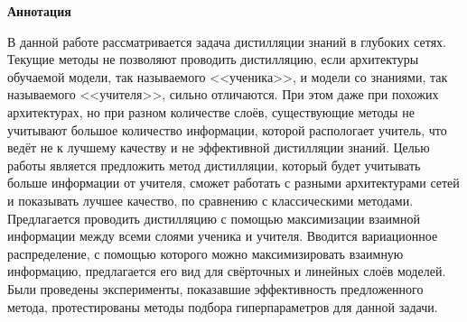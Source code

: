 \begin{center}
    \Large{\textbf{Аннотация}}
\end{center}

В данной работе рассматривается задача дистилляции знаний в глубоких сетях.
Текущие методы не позволяют проводить дистилляцию, если архитектуры обучаемой модели,
так называемого <<ученика>>, и модели со знаниями, так называемого <<учителя>>, сильно отличаются.
При этом даже при похожих архитектурах, но при разном количестве слоёв, существующие методы не учитывают большое количество информации,
которой распологает учитель, что ведёт не к лучшему качеству и не эффективной дистилляции знаний.
Целью работы является предложить метод дистилляции, который будет учитывать больше информации от учителя,
сможет работать с разными архитектурами сетей и показывать лучшее качество, по сравнению с классическими методами.
Предлагается проводить дистилляцию с помощью максимизации взаимной информации между всеми слоями ученика и учителя.
Вводится вариационное распределение, с помощью которого можно максимизировать взаимную информацию,
предлагается его вид для свёрточных и линейных слоёв моделей.
Были проведены эксперименты, показавшие эффективность предложенного метода,
протестированы методы подбора гиперпараметров для данной задачи.

